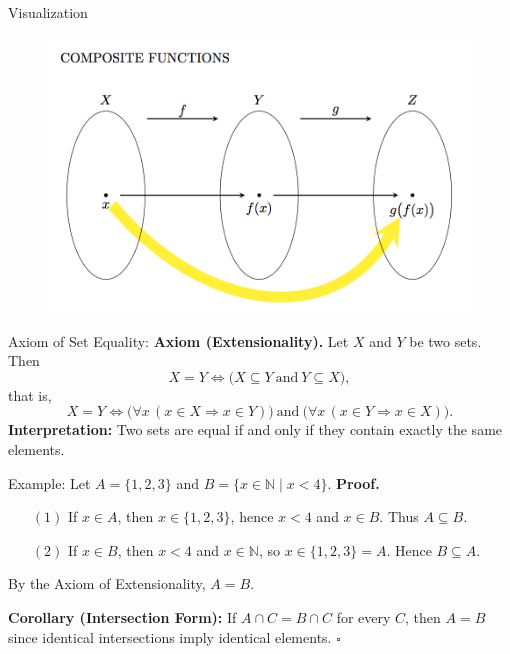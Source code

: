 \begin{frame}{Visualization}
    \begin{figure}
        \centering
        \includegraphics[width=0.8\linewidth]{Image4.png}
    \end{figure}
\end{frame}

\begin{frame}{Axiom of Set Equality:}
\textbf{Axiom (Extensionality).}
Let $X$ and $Y$ be two sets. Then
\[
X = Y \iff \bigl( X \subseteq Y \ \text{and}\  Y \subseteq X \bigr),
\]
that is,
\[
X = Y \iff \bigl( \forall x\, (x \in X \Rightarrow x \in Y) \bigr)
\ \text{and}\
\bigl( \forall x\, (x \in Y \Rightarrow x \in X) \bigr).
\]
\textbf{Interpretation:} Two sets are equal if and only if they contain exactly the same elements.

\begin{exampleblock}{Example: Let $A = \{1,2,3\}$ and $B = \{x \in \mathbb{N} \mid x < 4\}$.}
\textbf{Proof.}
\begin{itemize}
  \item[$(1)$] If $x \in A$, then $x \in \{1,2,3\}$, hence $x < 4$ and $x \in B$. Thus $A \subseteq B$.
  \item[$(2)$] If $x \in B$, then $x < 4$ and $x \in \mathbb{N}$, so $x \in \{1,2,3\}=A$. Hence $B \subseteq A$.
\end{itemize}
By the Axiom of Extensionality, $A=B$.

\textbf{Corollary (Intersection Form):}
If $A \cap C = B \cap C$ for every $C$, then $A=B$ since identical intersections imply identical elements. $\square$
\end{exampleblock}
\end{frame}

